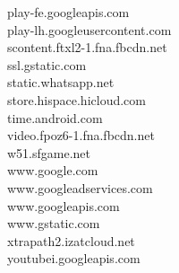 \documentclass[12pt,a4paper]{article}
\begin{document}
\begin{scriptsize}
\begin{multicols}{3}
\begin{center}
                        play-fe.googleapis.com\\play-lh.googleusercontent.com\\scontent.ftxl2-1.fna.fbcdn.net\\ssl.gstatic.com\\
                        static.whatsapp.net\\store.hispace.hicloud.com\\time.android.com\\video.fpoz6-1.fna.fbcdn.net\\
                        w51.sfgame.net\\www.google.com\\www.googleadservices.com\\www.googleapis.com\\www.gstatic.com\\
                        xtrapath2.izatcloud.net\\youtubei.googleapis.com\\
                \end{center}
            \end{multicols}
        \end{scriptsize}
\end{document}
